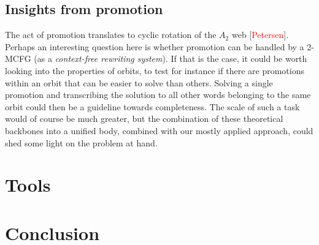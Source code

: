 \documentclass[nonatbib,numbers,10pt]{sigplanconf}
\newcommand\todo[1]{\textcolor{red}{#1}}
\begin{document}
\subsection{Insights from promotion}
The act of promotion translates to cyclic rotation of the $A_2$ web [\todo{Petersen}]. Perhaps an interesting question here is whether promotion can be handled by a 2-MCFG (as a \textit{context-free rewriting system}). If that is the case, it could be worth looking into the properties of orbits, to test for instance if there are promotions within an orbit that can be easier to solve than others. Solving a single promotion and transcribing the solution to all other words belonging to the same orbit could then be a guideline towards completeness. The scale of such a task would of course be much greater, but the combination of these theoretical backbones into a unified body, combined with our mostly applied approach, could shed some light on the problem at hand.

\section{Tools}
\section{Conclusion}
\end{document}

